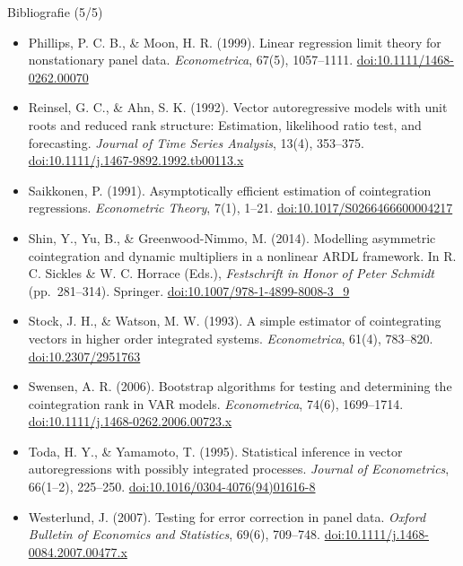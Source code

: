 \begin{frame}{Bibliografie (5/5)}
\itemsize{\tiny}
\begin{itemize}
    \item Phillips, P. C. B., \& Moon, H. R. (1999). Linear regression limit theory for nonstationary panel data. \textit{Econometrica}, 67(5), 1057--1111. \href{https://doi.org/10.1111/1468-0262.00070}{doi:10.1111/1468-0262.00070}
    \item Reinsel, G. C., \& Ahn, S. K. (1992). Vector autoregressive models with unit roots and reduced rank structure: Estimation, likelihood ratio test, and forecasting. \textit{Journal of Time Series Analysis}, 13(4), 353--375. \href{https://doi.org/10.1111/j.1467-9892.1992.tb00113.x}{doi:10.1111/j.1467-9892.1992.tb00113.x}
    \item Saikkonen, P. (1991). Asymptotically efficient estimation of cointegration regressions. \textit{Econometric Theory}, 7(1), 1--21. \href{https://doi.org/10.1017/S0266466600004217}{doi:10.1017/S0266466600004217}
    \item Shin, Y., Yu, B., \& Greenwood-Nimmo, M. (2014). Modelling asymmetric cointegration and dynamic multipliers in a nonlinear ARDL framework. In R. C. Sickles \& W. C. Horrace (Eds.), \textit{Festschrift in Honor of Peter Schmidt} (pp.\ 281--314). Springer. \href{https://doi.org/10.1007/978-1-4899-8008-3_9}{doi:10.1007/978-1-4899-8008-3\_9}
    \item Stock, J. H., \& Watson, M. W. (1993). A simple estimator of cointegrating vectors in higher order integrated systems. \textit{Econometrica}, 61(4), 783--820. \href{https://doi.org/10.2307/2951763}{doi:10.2307/2951763}
    \item Swensen, A. R. (2006). Bootstrap algorithms for testing and determining the cointegration rank in VAR models. \textit{Econometrica}, 74(6), 1699--1714. \href{https://doi.org/10.1111/j.1468-0262.2006.00723.x}{doi:10.1111/j.1468-0262.2006.00723.x}
    \item Toda, H. Y., \& Yamamoto, T. (1995). Statistical inference in vector autoregressions with possibly integrated processes. \textit{Journal of Econometrics}, 66(1--2), 225--250. \href{https://doi.org/10.1016/0304-4076(94)01616-8}{doi:10.1016/0304-4076(94)01616-8}
    \item Westerlund, J. (2007). Testing for error correction in panel data. \textit{Oxford Bulletin of Economics and Statistics}, 69(6), 709--748. \href{https://doi.org/10.1111/j.1468-0084.2007.00477.x}{doi:10.1111/j.1468-0084.2007.00477.x}
\end{itemize}
\end{frame}


